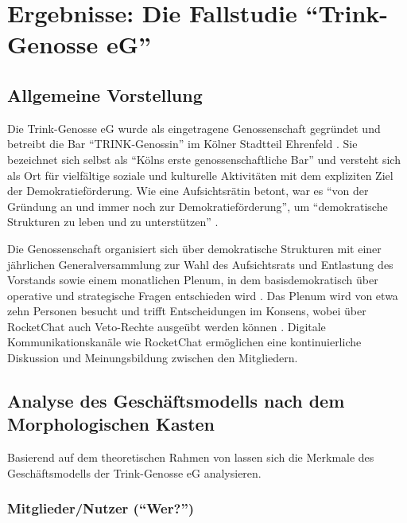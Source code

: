 \section{Ergebnisse: Die Fallstudie \enquote{Trink-Genosse eG}}

\subsection{Allgemeine Vorstellung}

Die Trink-Genosse eG wurde als eingetragene Genossenschaft gegründet und betreibt die Bar \enquote{TRINK-Genossin} im Kölner Stadtteil Ehrenfeld \parencite{SatzungTRINKGENOSSE2019}. Sie bezeichnet sich selbst als \enquote{Kölns erste genossenschaftliche Bar} und versteht sich als Ort für vielfältige soziale und kulturelle Aktivitäten mit dem expliziten Ziel der Demokratieförderung. Wie eine Aufsichtsrätin betont, war es \enquote{von der Gründung an und immer noch zur Demokratieförderung}, um \enquote{demokratische Strukturen zu leben und zu unterstützen} \parencite{mederInterviewZurGeschaftsmodellanalyse2025}.

Die Genossenschaft organisiert sich über demokratische Strukturen mit einer jährlichen Generalversammlung zur Wahl des Aufsichtsrats und Entlastung des Vorstands sowie einem monatlichen Plenum, in dem basisdemokratisch über operative und strategische Fragen entschieden wird \parencite{SatzungTRINKGENOSSE2019}. Das Plenum wird von etwa zehn Personen besucht und trifft Entscheidungen im Konsens, wobei über RocketChat auch Veto-Rechte ausgeübt werden können \parencite{mederInterviewZurGeschaftsmodellanalyse2025}. Digitale Kommunikationskanäle wie RocketChat ermöglichen eine kontinuierliche Diskussion und Meinungsbildung zwischen den Mitgliedern.

\subsection{Analyse des Geschäftsmodells nach dem Morphologischen Kasten}

Basierend auf dem theoretischen Rahmen von \textcite{blome-dreesGenossenschaftlicheGeschaeftsmodelleSemantik2023} lassen sich die Merkmale des Geschäftsmodells der Trink-Genosse eG analysieren.



\subsubsection{Mitglieder/Nutzer (\enquote{Wer?})}


